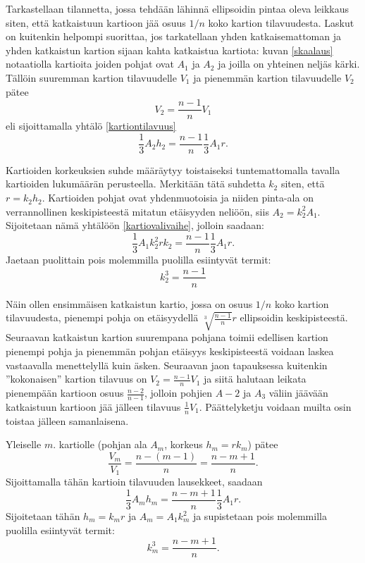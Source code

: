 \documentclass[12pt,a4paper,titlepage]{article}
\begin{document}
Tarkastellaan tilannetta, jossa tehdään lähinnä ellipsoidin pintaa oleva leikkaus siten, että katkaistuun kartioon jää osuus $1/n$ koko kartion tilavuudesta. Laskut on kuitenkin helpompi suorittaa, jos tarkatellaan yhden katkaisemattoman ja yhden katkaistun kartion sijaan kahta katkaistua kartiota: kuvan \ref{skaalaus} notaatiolla kartioita joiden pohjat ovat $A_1$ ja $A_2$ ja joilla on yhteinen neljäs kärki. Tällöin suuremman kartion tilavuudelle $V_1$ ja pienemmän kartion tilavuudelle $V_2$ pätee 
\begin{equation*}
	V_2 = \frac{n-1}{n}V_1
\end{equation*}
eli sijoittamalla yhtälö \ref{kartiontilavuus}
\begin{equation}\label{kartiovalivaihe}
	\frac{1}{3}A_2h_2 = \frac{n-1}{n}\frac{1}{3}A_1r.
\end{equation}

Kartioiden korkeuksien suhde määräytyy toistaiseksi tuntemattomalla tavalla kartioiden lukumäärän perusteella. Merkitään tätä suhdetta $k_2$ siten, että $r=k_2h_2$. Kartioiden pohjat ovat yhdenmuotoisia ja niiden pinta-ala on verrannollinen keskipisteestä mitatun etäisyyden neliöön, siis $A_2=k_2^2A_1$. Sijoitetaan nämä yhtälöön \ref{kartiovalivaihe}, jolloin saadaan:
\begin{equation}\label{kartiovalivaihe}
	\frac{1}{3}A_1k_2^2rk_2 = \frac{n-1}{n}\frac{1}{3}A_1r.
\end{equation}
Jaetaan puolittain pois molemmilla puolilla esiintyvät termit:
\begin{equation}\label{kartiovalivaihe}
	k_2^3 = \frac{n-1}{n}
\end{equation}

Näin ollen ensimmäisen katkaistun kartio, jossa on osuus $1/n$ koko kartion tilavuudesta, pienempi pohja on etäisyydellä $\sqrt[3]{\frac{n-1}{n}}r$ ellipsoidin keskipisteestä. Seuraavan katkaistun kartion suurempana pohjana toimii edellisen kartion pienempi pohja ja pienemmän pohjan etäisyys keskipisteestä voidaan laskea vastaavalla menettelyllä kuin äsken. Seuraavan jaon tapauksessa kuitenkin ''kokonaisen'' kartion tilavuus on $V_2=\frac{n-1}{n}V_1$ ja siitä halutaan leikata pienempään kartioon osuus $\frac{n-2}{n-1}$, jolloin pohjien $A-2$ ja $A_3$ väliin jäävään katkaistuun kartioon jää jälleen tilavuus $\frac{1}{n}V_1$. Päättelyketju voidaan muilta osin toistaa jälleen samanlaisena. 

Yleiselle $m$. kartiolle (pohjan ala $A_m$, korkeus $h_m=rk_m$) pätee
\begin{equation*}
	\frac{V_m}{V_1} = \frac{n-(m-1)}{n} = \frac{n-m+1}{n}.
\end{equation*}
Sijoittamalla tähän kartioin tilavuuden lausekkeet, saadaan
\begin{equation*}
	\frac{1}{3}A_mh_m = \frac{n-m+1}{n}\frac{1}{3}A_1r.
\end{equation*}
Sijoitetaan tähän $h_m=k_mr$ ja $A_m=A_1k_m^2$ ja supistetaan pois molemmilla puolilla esiintyvät termit:
\begin{equation} \label{k-yhtalo}
	k_m^3= \frac{n-m+1}{n}.
\end{equation}
\end{document}
